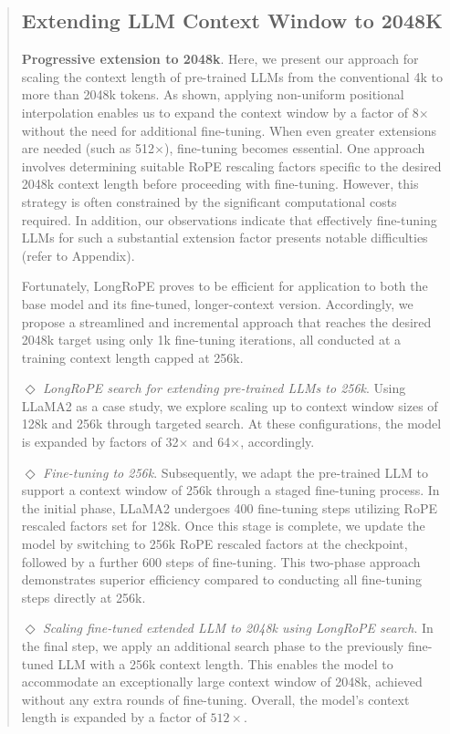 \begin{abstract}
\subsection{Extending LLM Context Window to 2048K}
\label{sec:extendto2048k}

\textbf{Progressive extension to 2048k}. Here, we present our approach for scaling the context length of pre-trained LLMs from the conventional 4k to more than 2048k tokens. As shown, applying non-uniform positional interpolation enables us to expand the context window by a factor of 8$\times$ without the need for additional fine-tuning. When even greater extensions are needed (such as 512$\times$), fine-tuning becomes essential. One approach involves determining suitable RoPE rescaling factors specific to the desired 2048k context length before proceeding with fine-tuning. However, this strategy is often constrained by the significant computational costs required. In addition, our observations indicate that effectively fine-tuning LLMs for such a substantial extension factor presents notable difficulties (refer to Appendix).

Fortunately, LongRoPE proves to be efficient for application to both the base model and its fine-tuned, longer-context version. Accordingly, we propose a streamlined and incremental approach that reaches the desired 2048k target using only 1k fine-tuning iterations, all conducted at a training context length capped at 256k.

$\Diamond$ \textit{LongRoPE search for extending pre-trained LLMs to 256k}. Using LLaMA2 as a case study, we explore scaling up to context window sizes of 128k and 256k through targeted search. At these configurations, the model is expanded by factors of 32$\times$ and 64$\times$, accordingly.

$\Diamond$ \textit{Fine-tuning to 256k}. Subsequently, we adapt the pre-trained LLM to support a context window of 256k through a staged fine-tuning process. In the initial phase, LLaMA2 undergoes 400 fine-tuning steps utilizing RoPE rescaled factors set for 128k. Once this stage is complete, we update the model by switching to 256k RoPE rescaled factors at the checkpoint, followed by a further 600 steps of fine-tuning. This two-phase approach demonstrates superior efficiency compared to conducting all fine-tuning steps directly at 256k.

$\Diamond$ \textit{Scaling fine-tuned extended LLM to 2048k using LongRoPE search}. In the final step, we apply an additional search phase to the previously fine-tuned LLM with a 256k context length. This enables the model to accommodate an exceptionally large context window of 2048k, achieved without any extra rounds of fine-tuning. Overall, the model's context length is expanded by a factor of $512\times$.


\end{abstract}
